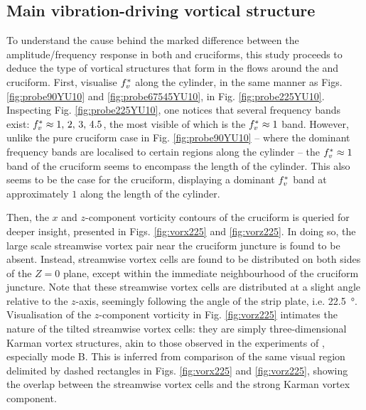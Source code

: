 \documentclass[oneside]{utmthesis}
\begin{document}
\subsection{Main vibration-driving vortical structure}\label{ssec:kvivRegimeVortStruct}
To understand the cause behind the marked difference between the amplitude/frequency response in both \angfo{} and \angth{} cruciforms, this study proceeds to deduce the type of vortical structures that form in the flows around the \angtw{} and \angon{} cruciform. First, visualise $f^{*}_{v}$ along the cylinder, in the same manner as Figs. \ref{fig:probe90YU10} and \ref{fig:probe67545YU10}, in Fig. \ref{fig:probe225YU10}. Inspecting Fig. \ref{fig:probe225YU10}, one notices that several frequency bands exist: $f^{*}_{v} \approx 1,\, 2,\, 3,\, 4.5$, the most visible of which is the $f^{*}_{v} \approx 1$ band. However, unlike the pure cruciform case in Fig. \ref{fig:probe90YU10} -- where the dominant frequency bands are localised to certain regions along the cylinder -- the $f^{*}_{v} \approx 1$ band of the \angtw{} cruciform seems to encompass the length of the cylinder. This also seems to be the case for the \angon{} cruciform, displaying a dominant $f^{*}_{v}$ band at approximately $1$ along the length of the cylinder.

Then, the $x$ and $z$-component vorticity contours of the \angtw{} cruciform is queried for deeper insight, presented in Figs. \ref{fig:vorx225} and \ref{fig:vorz225}. In doing so, the large scale streamwise vortex pair near the cruciform juncture is found to be absent. Instead, streamwise vortex cells are found to be distributed on both sides of the $Z = 0$ plane, except within the immediate neighbourhood of the cruciform juncture. Note that these streamwise vortex cells are distributed at a slight angle relative to the $z$-axis, seemingly following the angle of the strip plate, i.e. \SI{22.5}{\degree}. Visualisation of the $z$-component vorticity in Fig. \ref{fig:vorz225} intimates the nature of the tilted streamwise vortex cells: they are simply three-dimensional Karman vortex structures, akin to those observed in the experiments of \citet{Williamson1996a}, especially mode B. This is inferred from comparison of the same visual region delimited by dashed rectangles in Figs. \ref{fig:vorx225} and \ref{fig:vorz225}, showing the overlap between the streamwise vortex cells and the strong Karman vortex component.
\end{document}
